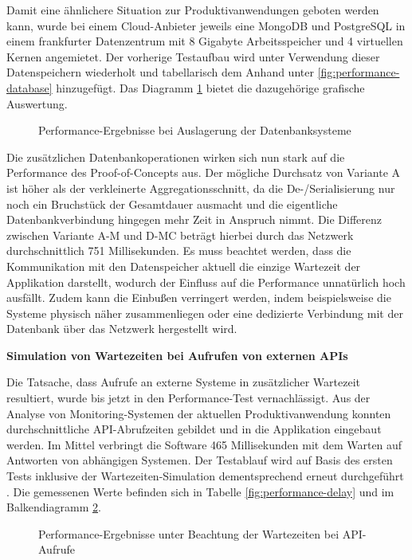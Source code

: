 Damit eine ähnlichere Situation zur Produktivanwendungen geboten werden kann, wurde bei einem Cloud-Anbieter jeweils eine MongoDB und PostgreSQL in einem frankfurter Datenzentrum mit 8 Gigabyte Arbeitsspeicher und 4 virtuellen Kernen angemietet. Der vorherige Testaufbau wird unter Verwendung dieser Datenspeichern wiederholt und tabellarisch dem Anhand unter \ref{fig:performance-database} hinzugefügt. Das Diagramm \ref{fig:PerformanceDatabase} bietet die dazugehörige grafische Auswertung.

\begin{figure}
	\centering
	\footnotesize
	
	\caption{Performance-Ergebnisse bei Auslagerung der Datenbanksysteme}
	\label{fig:PerformanceDatabase}
\end{figure}

Die zusätzlichen Datenbankoperationen wirken sich nun stark auf die Performance des Proof-of-Concepts aus. Der mögliche Durchsatz von Variante A ist höher als der verkleinerte Aggregationsschnitt, da die De-/Serialisierung nur noch ein Bruchstück der Gesamtdauer ausmacht und die eigentliche Datenbankverbindung hingegen mehr Zeit in Anspruch nimmt. Die Differenz zwischen Variante A-M und D-MC beträgt hierbei durch das Netzwerk durchschnittlich 751 Millisekunden. Es muss beachtet werden, dass die Kommunikation mit den Datenspeicher aktuell die einzige Wartezeit der Applikation darstellt, wodurch der Einfluss auf die Performance unnatürlich hoch ausfällt. Zudem kann die Einbußen verringert werden, indem beispielsweise die Systeme physisch näher zusammenliegen oder eine dedizierte Verbindung mit der Datenbank über das Netzwerk hergestellt wird.


\textbf{Simulation von Wartezeiten bei Aufrufen von externen APIs}

Die Tatsache, dass Aufrufe an externe Systeme in zusätzlicher Wartezeit resultiert, wurde bis jetzt in den Performance-Test vernachlässigt. Aus der Analyse von Monitoring-Systemen der aktuellen Produktivanwendung konnten durchschnittliche API-Abrufzeiten gebildet und in die Applikation eingebaut werden. Im Mittel verbringt die Software 465 Millisekunden mit dem Warten auf Antworten von abhängigen Systemen. Der Testablauf wird auf Basis des ersten Tests inklusive der Wartezeiten-Simulation dementsprechend erneut durchgeführt . Die gemessenen Werte befinden sich in Tabelle \ref{fig:performance-delay} und im Balkendiagramm \ref{fig:PerformanceDelay}. 

\begin{figure}
	\centering
	\footnotesize
	
	\caption{Performance-Ergebnisse unter Beachtung der Wartezeiten bei API-Aufrufe}
	\label{fig:PerformanceDelay}
\end{figure}

